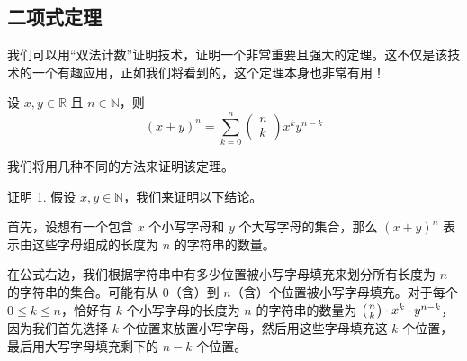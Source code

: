 
\subsection{二项式定理}\label{sec:section8.4.4}

我们可以用``双法计数''证明技术，证明一个非常重要且强大的定理。这不仅是该技术的一个有趣应用，正如我们将看到的，这个定理本身也非常有用！

\begin{theorem}
    设 $x, y \in \mathbb{R}$ 且 $n \in \mathbb{N}$，则
    \[(x+y)^n = \sum_{k=0}^{n} \begin{pmatrix}n\\k\end{pmatrix}x^ky^{n-k}\]
\end{theorem}
我们将用几种不同的方法来证明该定理。

\begin{proofs}{证明 1.}
    假设 $x, y \in \mathbb{N}$，我们来证明以下结论。

    首先，设想有一个包含 $x$ 个小写字母和 $y$ 个大写字母的集合，那么 $(x + y)^n$ 表示由这些字母组成的长度为 $n$ 的字符串的数量。

    在公式右边，我们根据字符串中有多少位置被小写字母填充来划分所有长度为 $n$ 的字符串的集合。可能有从 $0$（含）到 $n$（含）个位置被小写字母填充。对于每个 $0 \le k \le n$，恰好有 $k$ 个小写字母的长度为 $n$ 的字符串的数量为 $\big({n \atop k}\big) \cdot x^k \cdot y^{n-k}$，因为我们首先选择 $k$ 个位置来放置小写字母，然后用这些字母填充这 $k$ 个位置，最后用大写字母填充剩下的 $n - k$ 个位置。
\end{proofs}

